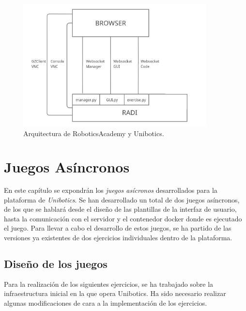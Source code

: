 \documentclass[a4paper, 12pt]{book}
\begin{document}
\begin{figure}[H]
	\centering
    \includegraphics[width=10cm]{img/robotics_academy_architecture.png}
    \caption{Arquitectura de RoboticsAcademy y Unibotics.}
    \label{figura:unibotics_architecture}
\end{figure}



\cleardoublepage
\chapter{Juegos Asíncronos}

En este capítulo se expondrán los \emph{juegos asícronos} desarrollados para la plataforma de \textit{Unibotics}. Se han desarrollado un total de dos juegos asíncronos, de los que se hablará desde el diseño de las plantillas de la interfaz de usuario, hasta la comunicación con el servidor y el contenedor docker donde es ejecutado el juego. Para llevar a cabo el desarrollo de estos juegos, se ha partido de las versiones ya existentes de dos ejercicios individuales dentro de la plataforma.

\section{Diseño de los juegos}
\label{sec:async_infraestructura}

Para la realización de los siguientes ejercicios, se ha trabajado sobre la infraestructura inicial en la que opera Unibotics. Ha sido necesario realizar algunas modificaciones de cara a la implementación de los ejercicios. 
\end{document}
